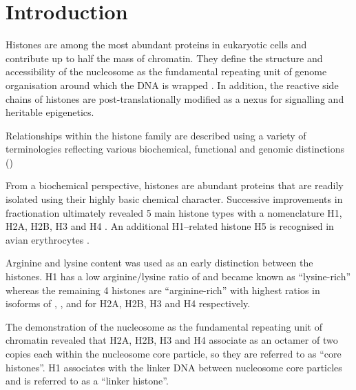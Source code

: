 \section{Introduction}

  Histones are among the most abundant proteins in eukaryotic cells and contribute up to half the mass of chromatin. 
  They define the structure and accessibility of the nucleosome as the fundamental repeating unit of genome organisation 
  around which the DNA is wrapped .
  In addition, the reactive side chains of histones are post-translationally modified 
  as a nexus for signalling and heritable epigenetics. 

  Relationships within the histone family are described using a variety of terminologies
  reflecting various biochemical, functional and genomic distinctions ()
  
  From a biochemical perspective, histones are abundant proteins 
  that are readily isolated using their highly basic chemical character. 
  Successive improvements in fractionation ultimately revealed 5 main histone types 
  with a nomenclature H1, H2A, H2B, H3 and H4 \citep{nomenclature}.
  An additional H1--related histone H5 is recognised in avian erythrocytes \citep{HFive-review}.

  Arginine and lysine content was used as an early distinction between the histones. 
  H1 has a low arginine/lysine ratio of \LinkerArgLysRatio{} and became known as ``lysine-rich'' 
  whereas the remaining 4 histones are ``arginine-rich'' with highest ratios in isoforms of 
  \HTwoAArgLysRatio{},  \HTwoBArgLysRatio{}, \HThreeArgLysRatio{} and \HFourArgLysRatio{}
  for H2A, H2B, H3 and H4 respectively.

  The demonstration of the nucleosome as the fundamental repeating unit of chromatin  
  revealed that H2A, H2B, H3 and H4 associate as an octamer of two copies each within the
  nucleosome core particle, so they are referred to as ``core histones''. 
  H1 associates with the linker DNA between nucleosome core particles and is referred to as a ``linker histone''.

